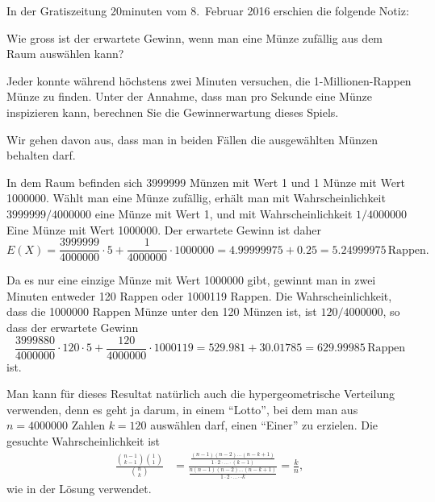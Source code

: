 In der Gratiszeitung 20minuten vom 8.~Februar 2016 erschien die folgende
Notiz:
\begin{center}
\end{center}
\begin{teilaufgaben}
\item Wie gross ist der erwartete Gewinn, wenn man eine Münze zufällig
aus dem Raum auswählen kann?
\item
Jeder konnte während höchstens zwei Minuten versuchen, die 1-Millionen-Rappen
Münze zu finden. 
Unter der Annahme, dass man pro Sekunde eine Münze inspizieren kann, 
berechnen Sie die Gewinnerwartung dieses Spiels.
\end{teilaufgaben}
Wir gehen davon aus, dass man in beiden Fällen die ausgewählten Münzen
behalten darf.

\begin{loesung}
\begin{teilaufgaben}
\item
In dem Raum befinden sich 3999999 Münzen mit Wert 1 und 1 Münze mit
Wert 1000000.
Wählt man eine Münze zufällig, erhält man mit Wahrscheinlichkeit
$3999999/4000000$ eine Münze mit Wert 1, und mit Wahrscheinlichkeit
$1/4000000$ Eine Münze mit Wert 1000000.
Der erwartete Gewinn ist daher
\[
E(X) = \frac{3999999}{4000000}\cdot 5 + \frac{1}{4000000}\cdot 1000000
=4.99999975 + 0.25 = 5.24999975\,\text{Rappen}.
\]
\item
Da es nur eine einzige Münze mit Wert 1000000 gibt, gewinnt man
in zwei Minuten entweder 120 Rappen oder 1000119 Rappen.
Die Wahrscheinlichkeit, dass die 1000000 Rappen Münze unter den
120 Münzen ist, ist $120/4000000$, so dass der erwartete Gewinn
\[
\frac{3999880}{4000000}\cdot 120\cdot 5
+
\frac{120}{4000000}\cdot 1000119
=
529.981 + 30.01785=629.99985\,\text{Rappen}
\]
ist.
\end{teilaufgaben}
\end{loesung}

\begin{diskussion}
Man kann für dieses Resultat natürlich auch die hypergeometrische
Verteilung verwenden, denn es geht ja darum, in einem ``Lotto'', bei dem
man aus $n=4000000$ Zahlen $k=120$ auswählen darf, einen ``Einer''
zu erzielen.
Die gesuchte Wahrscheinlichkeit ist
\begin{align*}
\frac{\displaystyle\binom{n-1}{k-1}\binom{1}{1}}{\displaystyle\binom{n}{k}}
&=
\frac{\displaystyle\frac{(n-1)(n-2)\dots(n-k+1)}{1\cdot 2\cdot\dots\cdot (k-1)}}%
{\displaystyle\frac{n(n-1)(n-2)\dots(n-k+1)}{1\cdot 2\cdot\dots\cdots k}}
=\frac{k}{n},
\end{align*}
wie in der Lösung verwendet.
\end{diskussion}


